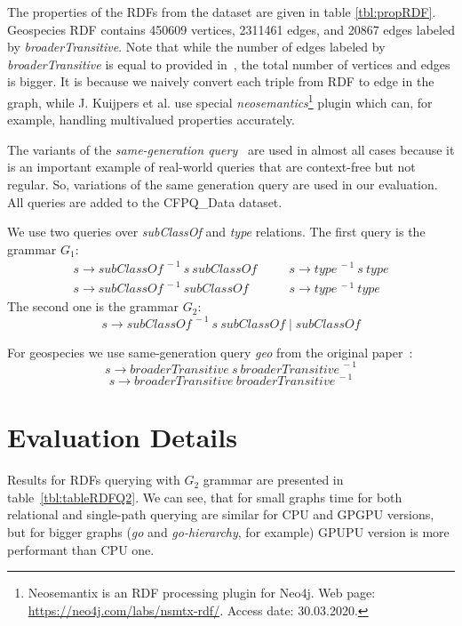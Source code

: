 The properties of the RDFs from the dataset are given in table \ref{tbl:propRDF}. 
Geospecies RDF contains 450609 vertices, 2311461 edges, and 20867 edges labeled by \textit{broaderTransitive}.
Note that while the number of edges labeled by \textit{broaderTransitive} is equal to provided in~\cite{Kuijpers:2019:ESC:3335783.3335791}, the total number of vertices and edges is bigger. It is because we naively convert each triple from RDF to edge in the graph, while J. Kuijpers et al. use special \textit{neosemantics}\footnote{Neosemantix is an RDF processing plugin for Neo4j. Web page: \url{https://neo4j.com/labs/nsmtx-rdf/}. Access date: 30.03.2020.} plugin which can, for example, handling multivalued properties accurately.  

The variants of the \textit{same-generation query}~\cite{FndDB} are used in almost all cases because it is an important example of real-world queries that are context-free but not regular.
So, variations of the same generation query are used in our evaluation.
All queries are added to the CFPQ\_Data dataset.

We use two queries over \textit{subClassOf} and \textit{type} relations.
The first query is the grammar $G_1$:
\[
 \begin{array}{lcl}
   s  \rightarrow \textit{subClassOf}^{\ -1} \ s \ \textit{subClassOf}   & \quad & s  \rightarrow \textit{type}^{\ -1} \ s \ \textit{type}     \\
   s  \rightarrow \textit{subClassOf}^{\ -1} \ \textit{subClassOf}       & \quad & s  \rightarrow  \textit{type}^{\ -1}  \ \textit{type}

 \end{array}
 \]
The second one is the grammar $G_2$: \[s \rightarrow \textit{subClassOf}^{\ -1} \ s \ \textit{subClassOf} \mid  \textit{subClassOf}\]

For geospecies we use same-generation query \textit{geo} from the original paper~\cite{Kuijpers:2019:ESC:3335783.3335791}: \[s \rightarrow \textit{broaderTransitive} \ s \ \textit{broaderTransitive}^{\ -1} \]
\[s \rightarrow \textit{broaderTransitive}  \ \textit{broaderTransitive}^{\ -1} \]


\section{Evaluation Details}

Results for RDFs querying with $G_2$ grammar are presented in table~\ref{tbl:tableRDFQ2}.
We can see, that for small graphs time for both relational and single-path querying are similar for CPU and GPGPU versions, but for bigger graphs (\textit{go} and \textit{go-hierarchy}, for example) GPUPU version is more performant than CPU one.

\balance

